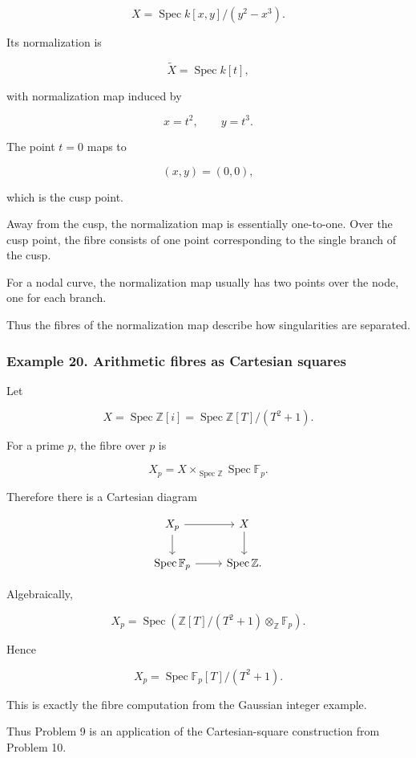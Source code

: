 \documentclass[12pt,a4paper]{article}
\theoremstyle{notespace}
\begin{document}
\[
X=\operatorname{Spec}k[x,y]/(y^2-x^3).
\]

Its normalization is

\[
\widetilde{X}=\operatorname{Spec}k[t],
\]

with normalization map induced by

\[
x=t^2,
\qquad
y=t^3.
\]

The point \(t=0\) maps to

\[
(x,y)=(0,0),
\]

which is the cusp point.

Away from the cusp, the normalization map is essentially one-to-one. Over the cusp point, the fibre consists of one point corresponding to the single branch of the cusp.

For a nodal curve, the normalization map usually has two points over the node, one for each branch.

Thus the fibres of the normalization map describe how singularities are separated.

\subsubsection{Example 20. Arithmetic fibres as Cartesian squares}

Let

\[
X=\operatorname{Spec}\mathbb{Z}[i]
=
\operatorname{Spec}\mathbb{Z}[T]/(T^2+1).
\]

For a prime \(p\), the fibre over \(p\) is

\[
X_p
=
X\times_{\operatorname{Spec}\mathbb{Z}}\operatorname{Spec}\mathbb{F}_p.
\]

Therefore there is a Cartesian diagram

\[
\begin{tikzcd}
	X_p \arrow[r] \arrow[d] & X \arrow[d] \\
	\operatorname{Spec}\mathbb{F}_p \arrow[r] & \operatorname{Spec}\mathbb{Z}.
\end{tikzcd}
\]

Algebraically,

\[
X_p
=
\operatorname{Spec}
\left(
\mathbb{Z}[T]/(T^2+1)\otimes_{\mathbb{Z}}\mathbb{F}_p
\right).
\]

Hence

\[
X_p
=
\operatorname{Spec}\mathbb{F}_p[T]/(T^2+1).
\]

This is exactly the fibre computation from the Gaussian integer example.

Thus Problem 9 is an application of the Cartesian-square construction from Problem 10.
\end{document}
